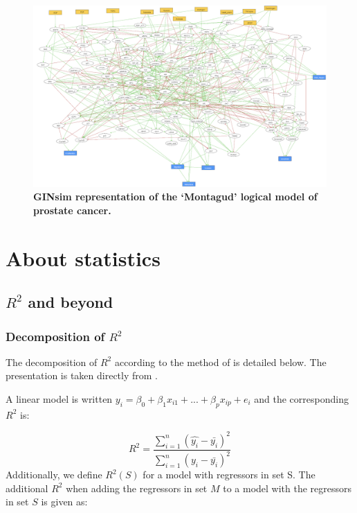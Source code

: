 \documentclass[a4paper,12pt,twoside,onecolumn,openright,final,oldfontcommands]{memoir}
\begin{document}
\begin{figure}

{\centering \includegraphics[width=0.9\linewidth]{fig/Montagud} 

}

\caption[GINsim representation of the "Montagud" logical model of prostate cancer]{\textbf{GINsim representation of the `Montagud'
logical model of prostate cancer.}}\label{fig:Montagud}
\end{figure}




\chapter{About statistics}\label{about-statistics}

\section{\texorpdfstring{\(R^2\) and
beyond}{R\^{}2 and beyond}}\label{r2-and-beyond}

\subsection{\texorpdfstring{Decomposition of
\(R^2\)}{Decomposition of R\^{}2}}\label{appendix-decomp}

The decomposition of \(R^2\) according to the method of
\citet{lindeman1980introduction} is detailed below. The presentation is
taken directly from \citet{gromping2006relative}.

A linear model is written
\(y_i=\beta_0+\beta_1x_{i1}+...+\beta_px_{ip}+e_i\) and the
corresponding \(R^2\) is:

\[R^2=\dfrac{\sum_{i=1}^{n} (\hat{y_i}-\bar{y_i})^2}{\sum_{i=1}^{n}  (y_i-\bar{y_i})^2}\]
Additionally, we define \(R^2(S)\) for a model with regressors in set S.
The additional \(R^2\) when adding the regressors in set \(M\) to a
model with the regressors in set \(S\) is given as:
\end{document}
